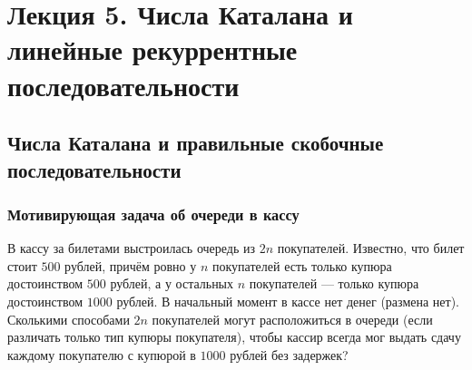 \section{Лекция 5. Числа Каталана и линейные рекуррентные последовательности}

\subsection{Числа Каталана и правильные скобочные последовательности}

\subsubsection{Мотивирующая задача об очереди в кассу}

\begin{problem}
    В кассу за билетами выстроилась очередь из $2n$ покупателей. Известно, 
    что билет стоит $500$ рублей, причём ровно у $n$ покупателей есть 
    только купюра достоинством $500$ рублей, а у остальных $n$ покупателей 
    --- только купюра достоинством $1000$ рублей. В начальный момент в 
    кассе нет денег (размена нет). Сколькими способами $2n$ покупателей 
    могут расположиться в очереди (если различать только тип купюры 
    покупателя), чтобы кассир всегда мог выдать сдачу каждому покупателю с 
    купюрой в $1000$ рублей без задержек?
\end{problem}

